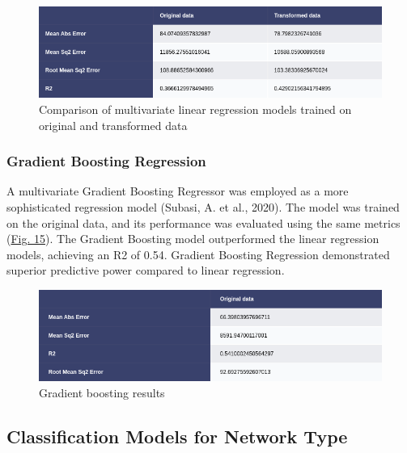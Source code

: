 \documentclass[
  letterpaper,
  DIV=11,
  numbers=noendperiod,
  oneside]{scrartcl}
\begin{document}
\begin{figure}

{\centering \includegraphics{lregm.png}

}

\caption{\label{fig-multiresults}Comparison of multivariate linear
regression models trained on original and transformed data}

\end{figure}

\hypertarget{gradient-boosting-regression}{%
\subsubsection{Gradient Boosting
Regression}\label{gradient-boosting-regression}}

A multivariate Gradient Boosting Regressor was employed as a more
sophisticated regression model (Subasi, A. et al., 2020). The model was
trained on the original data, and its performance was evaluated using
the same metrics (\protect\hyperlink{fig-gbresults}{Fig. 15}). The
Gradient Boosting model outperformed the linear regression models,
achieving an R2 of 0.54. Gradient Boosting Regression demonstrated
superior predictive power compared to linear regression.

\begin{figure}

{\centering \includegraphics{gbreg.png}

}

\caption{\label{fig-gbresults}Gradient boosting results}

\end{figure}

\hypertarget{classification-models-for-network-type}{%
\subsection{Classification Models for Network
Type}\label{classification-models-for-network-type}}
\end{document}
